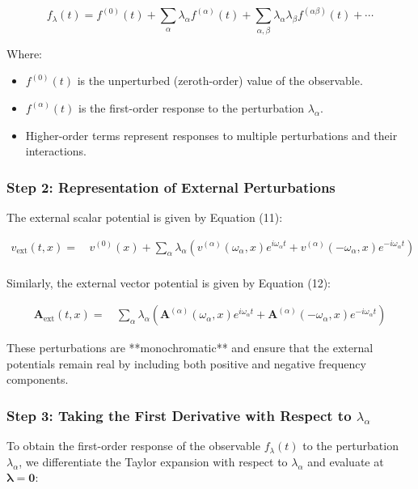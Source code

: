 \documentclass[12pt]{article}
\begin{document}
\[
f_{\lambda}(t) = f^{(0)}(t) + \sum_{\alpha} \lambda_{\alpha} f^{(\alpha)}(t) + \sum_{\alpha, \beta} \lambda_{\alpha} \lambda_{\beta} f^{(\alpha \beta)}(t) + \cdots
\]

Where:
\begin{itemize}
    \item \( f^{(0)}(t) \) is the unperturbed (zeroth-order) value of the observable.
    \item \( f^{(\alpha)}(t) \) is the first-order response to the perturbation \( \lambda_{\alpha} \).
    \item Higher-order terms represent responses to multiple perturbations and their interactions.
\end{itemize}

\subsubsection*{Step 2: Representation of External Perturbations}

The external scalar potential is given by Equation (11):

\[
\begin{aligned}
v_{\text{ext}}(t, x) = &\, v^{(0)}(x) + \sum_{\alpha} \lambda_{\alpha} \left( v^{(\alpha)}(\omega_{\alpha}, x) e^{i \omega_{\alpha} t} + v^{(\alpha)}(-\omega_{\alpha}, x) e^{-i \omega_{\alpha} t} \right) \\
\end{aligned} 
\]

\noindent Similarly, the external vector potential is given by Equation (12):

\[
\begin{aligned}
\mathbf{A}_{\text{ext}}(t, x) = &\, \sum_{\alpha} \lambda_{\alpha} \left( \mathbf{A}^{(\alpha)}(\omega_{\alpha}, x) e^{i \omega_{\alpha} t} + \mathbf{A}^{(\alpha)}(-\omega_{\alpha}, x) e^{-i \omega_{\alpha} t} \right)
\end{aligned} 
\]

\noindent These perturbations are **monochromatic** and ensure that the external potentials remain real by including both positive and negative frequency components.

\subsubsection*{Step 3: Taking the First Derivative with Respect to \( \lambda_{\alpha} \)}

To obtain the first-order response of the observable \( f_{\lambda}(t) \) to the perturbation \( \lambda_{\alpha} \), we differentiate the Taylor expansion with respect to \( \lambda_{\alpha} \) and evaluate at \( \boldsymbol{\lambda} = \mathbf{0} \):
\end{document}
